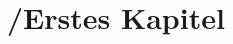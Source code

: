 \documentclass{article}
\begin{document}

\setcounter{page}{1}
\tableofcontents
\newpage

\section{/Erstes Kapitel}


\newpage
\end{document}
